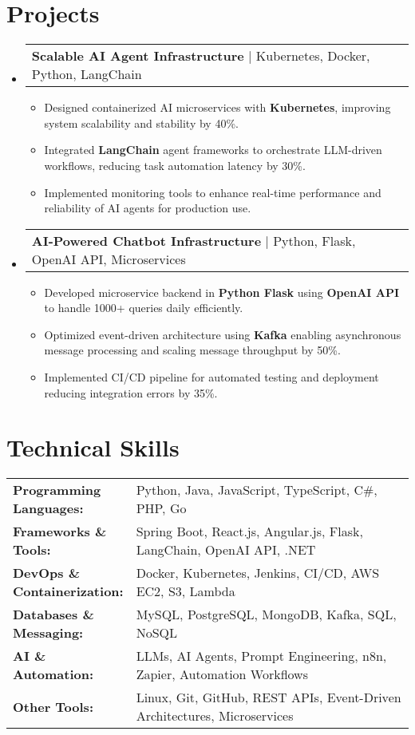 \documentclass[letterpaper,11pt]{article}
\makeatletter
\newcommand{\resumeItem}[1]{
  \item\footnotesize{
    {#1 \vspace{-2pt}}
  }
}
\newcommand{\resumeProjectHeading}[2]{
    \item
    \begin{tabular*}{1.001\textwidth}{l@{\extracolsep{\fill}}r}
      \small#1 & \textbf{\small #2}\\
    \end{tabular*}\vspace{-7pt}
}
\newcommand{\resumeSubHeadingListStart}{\begin{itemize}[leftmargin=0pt, label={}]}
\newcommand{\resumeSubHeadingListEnd}{\end{itemize}}
\newcommand{\resumeItemListStart}{\begin{itemize}[leftmargin=*]}
\newcommand{\resumeItemListEnd}{\end{itemize}\vspace{-5pt}}
\makeatother
\begin{document}
\section{Projects}
    \vspace{-5pt}
    \resumeSubHeadingListStart
      \resumeProjectHeading
          {\textbf{Scalable AI Agent Infrastructure} | Kubernetes, Docker, Python, LangChain}
          {}
          \resumeItemListStart
              \resumeItem{Designed containerized AI microservices with \textbf{Kubernetes}, improving system scalability and stability by 40\%.}
              \resumeItem{Integrated \textbf{LangChain} agent frameworks to orchestrate LLM-driven workflows, reducing task automation latency by 30\%.}
              \resumeItem{Implemented monitoring tools to enhance real-time performance and reliability of AI agents for production use.}
          \resumeItemListEnd
          \vspace{-16pt}
      \resumeProjectHeading
          {\textbf{AI-Powered Chatbot Infrastructure} | Python, Flask, OpenAI API, Microservices}
          {}
          \resumeItemListStart
              \resumeItem{Developed microservice backend in \textbf{Python Flask} using \textbf{OpenAI API} to handle 1000+ queries daily efficiently.}
              \resumeItem{Optimized event-driven architecture using \textbf{Kafka} enabling asynchronous message processing and scaling message throughput by 50\%.}
              \resumeItem{Implemented CI/CD pipeline for automated testing and deployment reducing integration errors by 35\%.}
          \resumeItemListEnd
    \resumeSubHeadingListEnd
\vspace{-10pt}
\section{Technical Skills}
        \vspace{-14pt}
        \begin{table}[h]
            \footnotesize
            \begin{tabular}{p{0.3\linewidth} p{0.7\linewidth}}
                \textbf{Programming Languages:} & Python, Java, JavaScript, TypeScript, C\#, PHP, Go \\
                \textbf{Frameworks \& Tools:} & Spring Boot, React.js, Angular.js, Flask, LangChain, OpenAI API, .NET \\
                \textbf{DevOps \& Containerization:} & Docker, Kubernetes, Jenkins, CI/CD, AWS EC2, S3, Lambda \\
                \textbf{Databases \& Messaging:} & MySQL, PostgreSQL, MongoDB, Kafka, SQL, NoSQL \\
                \textbf{AI \& Automation:} & LLMs, AI Agents, Prompt Engineering, n8n, Zapier, Automation Workflows \\
                \textbf{Other Tools:} & Linux, Git, GitHub, REST APIs, Event-Driven Architectures, Microservices \\
            \end{tabular}
        \end{table}
\end{document}
